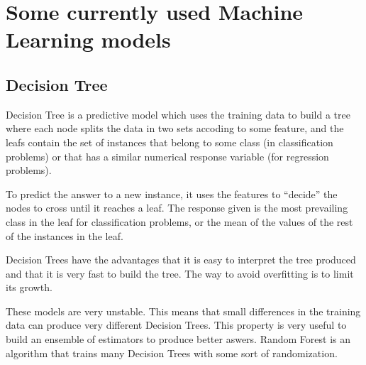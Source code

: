 \section{Some currently used Machine Learning models}


  \subsection{Decision Tree}
  \begin{pre-delivery}
    Decision Tree is a predictive model which uses the training data to build
    a tree where each node splits the data in two sets accoding to some
    feature, and the leafs contain the set of instances that belong to some class
    (in classification problems) or that has a similar numerical response variable
    (for regression problems).

    To predict the answer to a new instance, it uses the features to ``decide''
    the nodes to cross until it reaches a leaf. The response given is the
    most prevailing class in the leaf for classification problems, or the mean
    of the values of the rest of the instances in the leaf.

    Decision Trees have the advantages that it is easy to interpret the
    tree produced and that it is very fast to build the tree. The way to avoid
    overfitting is to limit its growth.

    These models are very unstable. This means that small differences in the
    training data can produce very different Decision Trees. This property
    is very useful to build an ensemble of estimators to produce better aswers.
    Random Forest is an algorithm that trains many Decision Trees with some sort
    of randomization.
  \end{pre-delivery}
